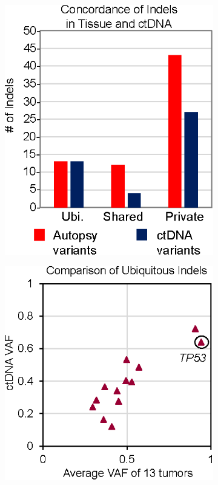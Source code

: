 \begin{figure}[p]
    \hspace{0.1\textwidth}%
    \begin{subfigure}{0.35\textwidth}
        \includegraphics[width=\linewidth,keepaspectratio]{images/sclc/tissue_ctdna_concordance_indel}
        \caption{}\label{fig:sclc:tissue_ctdna_concordance_indel}
    \end{subfigure}%
    \hfill%
    \begin{subfigure}{0.38\textwidth}
        \vspace{0.1cm}
        \includegraphics[width=\linewidth,keepaspectratio]{images/sclc/tissue_ctdna_ubiq_indel}

\end{subfigure}
\end{figure}
